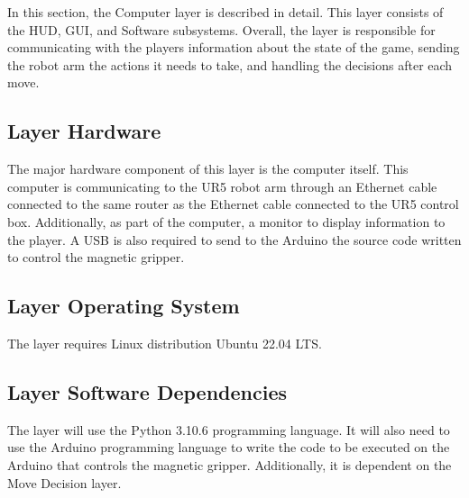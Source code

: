 In this section, the Computer layer is described in detail. This layer consists of the HUD, GUI, and Software subsystems. Overall, the layer is responsible for communicating with the players information about the state of the game, sending the robot arm the actions it needs to take, and handling the decisions after each move.

\subsection{Layer Hardware}
The major hardware component of this layer is the computer itself. This computer is communicating to the UR5 robot arm through an Ethernet cable connected to the same router as the Ethernet cable connected to the UR5 control box. Additionally, as part of the computer, a monitor to display information to the player. A USB is also required to send to the Arduino the source code written to control the magnetic gripper.


\subsection{Layer Operating System}
The layer requires Linux distribution Ubuntu 22.04 LTS.

\subsection{Layer Software Dependencies}
 The layer will use the Python 3.10.6 programming language. It will also need to use the Arduino programming language to write the code to be executed on the Arduino that controls the magnetic gripper. Additionally, it is dependent on the Move Decision layer.


